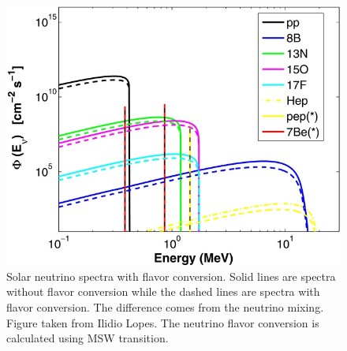 


\begin{figure}[!hbtp]
\centering
\includegraphics[width=\columnwidth]{chapters/assets/solar/solar_neutrino_spectra_flavor_conversion.jpg}
\caption{Solar neutrino spectra with flavor conversion. Solid lines are spectra without flavor conversion while the dashed lines are spectra with flavor conversion. The difference comes from the neutrino mixing. Figure taken from Ilidio Lopes.\cite{Lopes2013,Lopes2013a} The neutrino flavor conversion is calculated using MSW transition.}
\label{fig:solar_neutrino_spectra_flavor_conversion}
\end{figure}





